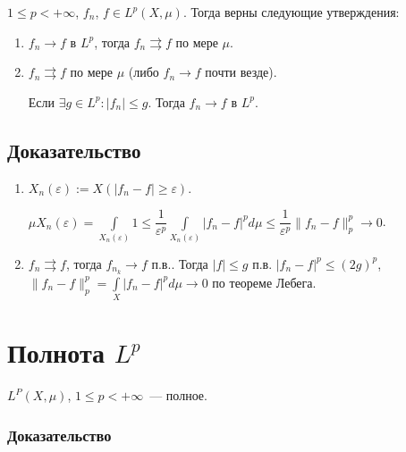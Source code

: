 \documentclass{article}
\begin{document}
        $1 \leqslant p < +\infty$, $f_n$, $f \in L^p(X, \mu)$. Тогда верны следующие утверждения:
        
        \begin{enumerate}
        
            \item $f_n \rightarrow f$ в $L^p$, тогда $f_n \rightrightarrows f$ по мере $\mu$.
            
            \item $f_n \rightrightarrows f$ по мере $\mu$ (либо $f_n \rightarrow f$ почти везде).
                
                Если $\exists g \in L^p : |f_n| \leqslant g$. Тогда $f_n \rightarrow f$ в $L^p$.
            
        \end{enumerate}
        
        \subsection{Доказательство}
            
            \begin{enumerate}
            
                \item $X_n(\varepsilon) := X \left( |f_n - f| \geqslant \varepsilon \right)$.
            
                    $\mu X_n(\varepsilon) = \int\limits_{X_n(\varepsilon)} 1 \leqslant \dfrac{1}{\varepsilon^p} \int\limits_{X_n(\varepsilon)} |f_n - f|^p d \mu \leqslant \dfrac{1}{\varepsilon^p} \| f_n - f \|^p_p \rightarrow 0$.
            
                \item $f_n \rightrightarrows f$, тогда $f_{n_k} \rightarrow f$ п.в.. Тогда $|f| \leqslant g$ п.в. $|f_n - f|^p \leqslant (2g)^p$, $\| f_n - f \|^p_p = \int\limits_X |f_n - f|^p d\mu \rightarrow 0$ по теореме Лебега.
                
            \end{enumerate}
    
    \newpage
    
    \section{Полнота $L^p$}
    
        $L^P(X, \mu)$, $1 \leqslant p < +\infty$~--- полное.
        
        \subsubsection{Доказательство}
        
\end{document}
